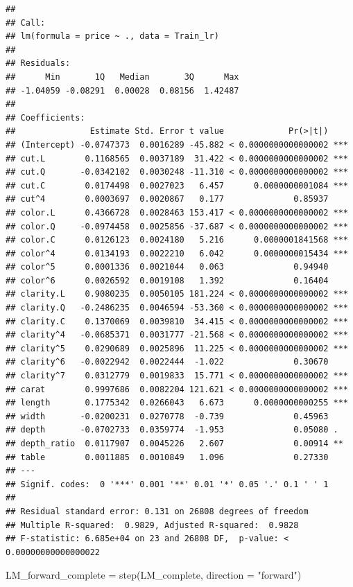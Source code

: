 \documentclass[
]{article}
\newenvironment{Shaded}{\begin{snugshade}}{\end{snugshade}}
\newcommand{\AttributeTok}[1]{\textcolor[rgb]{0.77,0.63,0.00}{#1}}
\newcommand{\FunctionTok}[1]{\textcolor[rgb]{0.00,0.00,0.00}{#1}}
\newcommand{\NormalTok}[1]{#1}
\newcommand{\OtherTok}[1]{\textcolor[rgb]{0.56,0.35,0.01}{#1}}
\newcommand{\StringTok}[1]{\textcolor[rgb]{0.31,0.60,0.02}{#1}}
\begin{document}
\begin{verbatim}
##
## Call:
## lm(formula = price ~ ., data = Train_lr)
##
## Residuals:
##      Min       1Q   Median       3Q      Max
## -1.04059 -0.08291  0.00028  0.08156  1.42487
##
## Coefficients:
##               Estimate Std. Error t value             Pr(>|t|)
## (Intercept) -0.0747373  0.0016289 -45.882 < 0.0000000000000002 ***
## cut.L        0.1168565  0.0037189  31.422 < 0.0000000000000002 ***
## cut.Q       -0.0342102  0.0030248 -11.310 < 0.0000000000000002 ***
## cut.C        0.0174498  0.0027023   6.457      0.0000000001084 ***
## cut^4        0.0003697  0.0020867   0.177              0.85937
## color.L      0.4366728  0.0028463 153.417 < 0.0000000000000002 ***
## color.Q     -0.0974458  0.0025856 -37.687 < 0.0000000000000002 ***
## color.C      0.0126123  0.0024180   5.216      0.0000001841568 ***
## color^4      0.0134193  0.0022210   6.042      0.0000000015434 ***
## color^5      0.0001336  0.0021044   0.063              0.94940
## color^6      0.0026592  0.0019108   1.392              0.16404
## clarity.L    0.9080235  0.0050105 181.224 < 0.0000000000000002 ***
## clarity.Q   -0.2486235  0.0046594 -53.360 < 0.0000000000000002 ***
## clarity.C    0.1370069  0.0039810  34.415 < 0.0000000000000002 ***
## clarity^4   -0.0685371  0.0031777 -21.568 < 0.0000000000000002 ***
## clarity^5    0.0290689  0.0025896  11.225 < 0.0000000000000002 ***
## clarity^6   -0.0022942  0.0022444  -1.022              0.30670
## clarity^7    0.0312779  0.0019833  15.771 < 0.0000000000000002 ***
## carat        0.9997686  0.0082204 121.621 < 0.0000000000000002 ***
## length       0.1775342  0.0266043   6.673      0.0000000000255 ***
## width       -0.0200231  0.0270778  -0.739              0.45963
## depth       -0.0702733  0.0359774  -1.953              0.05080 .
## depth_ratio  0.0117907  0.0045226   2.607              0.00914 **
## table        0.0011885  0.0010849   1.096              0.27330
## ---
## Signif. codes:  0 '***' 0.001 '**' 0.01 '*' 0.05 '.' 0.1 ' ' 1
##
## Residual standard error: 0.131 on 26808 degrees of freedom
## Multiple R-squared:  0.9829, Adjusted R-squared:  0.9828
## F-statistic: 6.685e+04 on 23 and 26808 DF,  p-value: < 0.00000000000000022
\end{verbatim}

\begin{Shaded}
\begin{Highlighting}[]
\NormalTok{LM\_forward\_complete }\OtherTok{=} \FunctionTok{step}\NormalTok{(LM\_complete, }\AttributeTok{direction =} \StringTok{"forward"}\NormalTok{)}
\end{Highlighting}
\end{Shaded}
\end{document}
